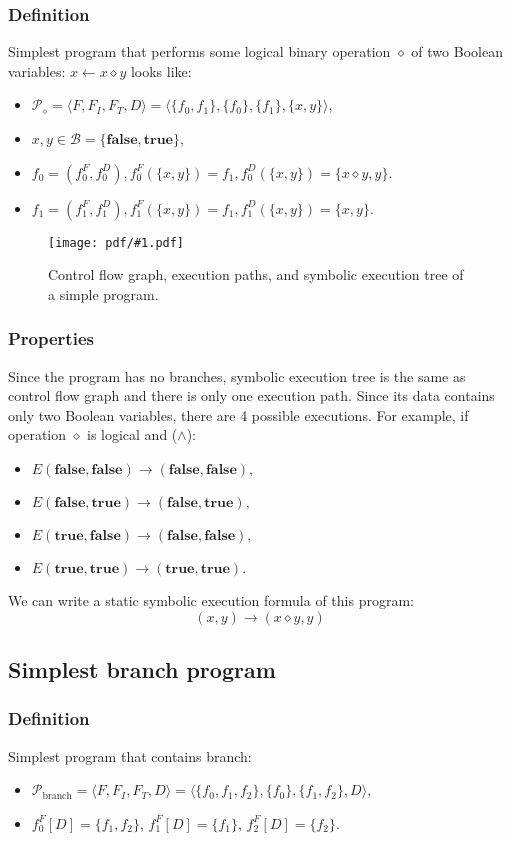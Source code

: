 \documentclass[oneside,a4]{article}  %
\newcommand{\sublevel}{\subsection}
\newcommand{\subsublevel}{\subsubsection}
\newcommand{\la}{\leftarrow}
\newcommand{\ra}{\rightarrow}
\newcommand{\true}{\textbf{true}}
\newcommand{\false}{\textbf{false}}
\newcommand{\centerimage}[2]{
\begin{figure}[h!]
    \begin{center}
        \texttt{[image: pdf/\#1.pdf]}
        \caption{#2}
    \end{center}
    \label{img:#1}
\end{figure}
}
\begin{document}
\subsublevel*{Definition}

Simplest program that performs some logical binary operation $\diamond$
of two Boolean variables: $x \la x \diamond y$ looks like:
\begin{itemize}
    \item $\mathcal{P}_{\diamond} = \langle F, F_I, F_T, D \rangle =
        \langle \{f_0, f_1\}, \{f_0\}, \{f_1\}, \{x, y\} \rangle$,
    \item $x, y \in \mathcal{B} = \{\false, \true\}$,
    \item $f_0 = (f^F_0, f^D_0), f^F_0(\{x, y\}) = f_1,
        f^D_0(\{x, y\}) = \{x \diamond y, y\}$.
    \item $f_1 = (f^F_1, f^D_1), f^F_1(\{x, y\}) = f_1,
        f^D_1(\{x, y\}) = \{x, y\}$.
\end{itemize}

\centerimage{simple}
    {Control flow graph, execution paths,
        and symbolic execution tree of a simple program.}

\subsublevel*{Properties}

Since the program has no branches, symbolic execution tree is the same as
control flow graph and there is only one execution path.
Since its data contains only two Boolean variables,
there are 4 possible executions.
For example, if operation $\diamond$ is logical and ($\land$):

\begin{itemize}
    \item $E(\false, \false) \ra (\false, \false),$
    \item $E(\false, \true) \ra (\false, \true),$
    \item $E(\true, \false) \ra (\false, \false),$
    \item $E(\true, \true) \ra (\true, \true).$
\end{itemize}

We can write a static symbolic execution formula of this program:
\[(x, y) \ra (x \diamond y, y)\]

\sublevel{Simplest branch program}

\subsublevel*{Definition}

Simplest program that contains branch:
\begin{itemize}
    \item $\mathcal{P}_{\text{branch}} = \langle F, F_I, F_T, D \rangle =
        \langle \{f_0, f_1, f_2\}, \{f_0\}, \{f_1, f_2\}, D \rangle$,
    \item $f_0^F[D] = \{f_1, f_2\}$,
        $f_1^F[D] = \{f_1\}$, $f_2^F[D] = \{f_2\}$.
\end{itemize}
\end{document}
